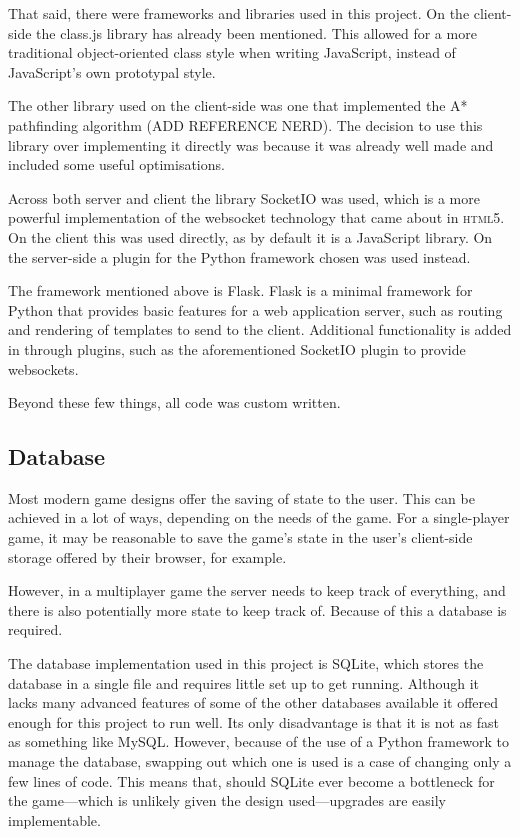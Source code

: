 That said, there were frameworks and libraries used in this project. On the client-side the class.js library has already been mentioned. This allowed for a more traditional object-oriented class style when writing JavaScript, instead of JavaScript's own prototypal style.

The other library used on the client-side was one that implemented the A* pathfinding algorithm (ADD REFERENCE NERD). The decision to use this library over implementing it directly was because it was already well made and included some useful optimisations.

Across both server and client the library SocketIO was used, which is a more powerful implementation of the websocket technology that came about in \textsc{html5}. On the client this was used directly, as by default it is a JavaScript library. On the server-side a plugin for the Python framework chosen was used instead.

The framework mentioned above is Flask. Flask is a minimal framework for Python that provides basic features for a web application server, such as routing and rendering of templates to send to the client. Additional functionality is added in through plugins, such as the aforementioned SocketIO plugin to provide websockets.

Beyond these few things, all code was custom written.

\subsection{Database}
Most modern game designs offer the saving of state to the user. This can be achieved in a lot of ways, depending on the needs of the game. For a single-player game, it may be reasonable to save the game's state in the user's client-side storage offered by their browser, for example.

However, in a multiplayer game the server needs to keep track of everything, and there is also potentially more state to keep track of. Because of this a database is required.

The database implementation used in this project is SQLite, which stores the database in a single file and requires little set up to get running. Although it lacks many advanced features of some of the other databases available it offered enough for this project to run well. Its only disadvantage is that it is not as fast as something like MySQL. However, because of the use of a Python framework to manage the database, swapping out which one is used is a case of changing only a few lines of code. This means that, should SQLite ever become a bottleneck for the game---which is unlikely given the design used---upgrades are easily implementable.

